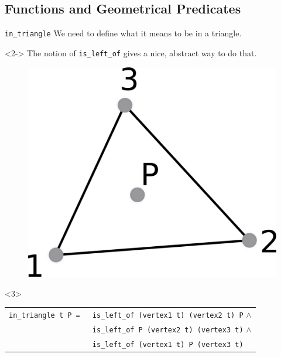 \documentclass[18pt]{beamer}
\begin{document}
\subsection{Functions and Geometrical Predicates}



\begin{frame}{\tt in\_triangle}
 We need to define what it means to be in a triangle.

\begin{minipage}{.6\textwidth}
\begin{uncoverenv}<2->
   The notion of {\tt is\_left\_of} gives a nice, abstract way to do that.
 \end{uncoverenv}
   \end{minipage}%
  \begin{minipage}{.4\textwidth}
  \begin{overprint}

        \begin{figure}
  	\centering
 	\includegraphics{intriangle}
      \end{figure}
  \end{overprint}
\end{minipage}
\begin{uncoverenv}<3>
 
 {\small \begin{tabular}{ll}
       {\tt in\_triangle t P = }& {\tt is\_left\_of (vertex1 t) (vertex2 t) P} $\wedge$\\
        &{\tt is\_left\_of P (vertex2 t) (vertex3 t)} $\wedge$\\
  & {\tt is\_left\_of (vertex1 t) P (vertex3 t)}
      \end{tabular}}

\end{uncoverenv}
\end{frame}
\end{document}
